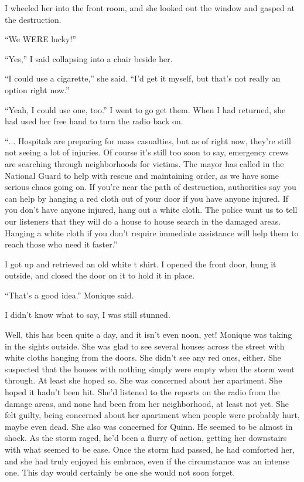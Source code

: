 I wheeled her into the front room, and she looked out the window and gasped at the
destruction.

``We WERE lucky!''

``Yes,'' I said collapsing into a chair beside her.

``I could use a cigarette,'' she said. ``I'd get it myself, but that's not really an option
right now.''

``Yeah, I could use one, too.'' I went to go get them. When I had returned, she had used
her free hand to turn the radio back on.

``$\ldots$ Hospitals are preparing for mass casualties, but as of right now, they're still
not seeing a lot of injuries. Of course it's still too soon to say, emergency crews are
searching through neighborhoods for victims. The mayor has called in the National Guard to help
with rescue and maintaining order, as we have some serious chaos going on. If you're near the
path of destruction, authorities say you can help by hanging a red cloth out of your door if you
have anyone injured. If you don't have anyone injured, hang out a white cloth. The police want
us to tell our listeners that they will do a house to house search in the damaged areas. Hanging
a white cloth if you don't require immediate assistance will help them to reach those who need
it faster.''

I got up and retrieved an old white t shirt. I opened the front door, hung it outside, and
closed the door on it to hold it in place.

``That's a good idea.'' Monique said.

I didn't know what to say, I was still stunned.

\begin{thought}
Well, this has been quite a day, and it isn't even noon, yet! Monique was taking in the
sights outside. She was glad to see several houses across the street with white cloths hanging
from the doors. She didn't see any red ones, either. She suspected that the houses with nothing
simply were empty when the storm went through. At least she hoped so. She was concerned about
her apartment. She hoped it hadn't been hit. She'd listened to the reports on the radio from the
damage areas, and none had been from her neighborhood, at least not yet. She felt guilty, being
concerned about her apartment when people were probably hurt, maybe even dead.
She also was concerned for Quinn. He seemed to be almost in shock. As the storm raged, he'd been
a flurry of action, getting her downstairs with what seemed to be ease. Once the storm had
passed, he had comforted her, and she had truly enjoyed his embrace, even if the circumstance
was an intense one. This day would certainly be one she would not soon forget.
\end{thought}

